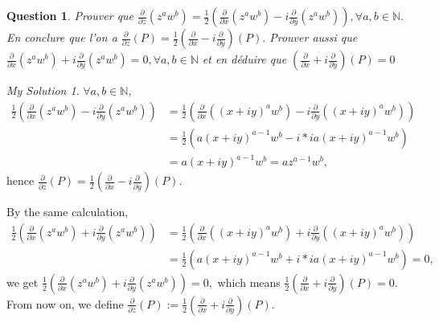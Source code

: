 \documentclass[]{article}
\newtheorem{prop}{Question}
\theoremstyle{remark}
\newtheorem*{sol}{My Solution}
\begin{document}
\begin{prop}
	Prouver que $\frac{\partial}{\partial z}\left(z^{a} w^{b}\right)=\frac{1}{2}\left(\frac{\partial}{\partial x}\left(z^{a} w^{b}\right)-i \frac{\partial}{\partial y}\left(z^{a} w^{b}\right)\right), \forall a, b \in \mathbb{N} .$ En conclure que l'on a $\frac{\partial}{\partial z}(P)=\frac{1}{2}\left(\frac{\partial}{\partial x}-i \frac{\partial}{\partial y}\right)(P) .$ Prouver aussi que $\frac{\partial}{\partial x}\left(z^{a} w^{b}\right)+i \frac{\partial}{\partial y}\left(z^{a} w^{b}\right)=0, \forall a, b \in \mathbb{N}$ et en déduire que $\left(\frac{\partial}{\partial x}+i \frac{\partial}{\partial y}\right)(P)=0$
\end{prop}
\begin{sol}
	$ \forall a, b \in \mathbb{N} $,
\[ \begin{aligned}
		\frac{1}{2}\left( \frac{\partial}{\partial x}\left(z^{a} w^{b}\right)-i\frac{\partial}{\partial y}\left(z^{a} w^{b}\right)\right) 
		&= \frac{1}{2}\left( \frac{\partial}{\partial x}\left((x+i y)^{a} w^{b}\right)-i\frac{\partial}{\partial y}\left((x+i y)^{a} w^{b}\right)\right)  \\
		&= \frac{1}{2}\left(  a(x+i y)^{a-1} w^{b}-i* i a(x+i y)^{a-1} w^{b}\right) \\
		&=a(x+i y)^{a-1} w^{b} = a z^{a-1} w^{b},
\end{aligned} \]
	hence $ \frac{\partial}{\partial z}(P) = \frac{1}{2}\left( \frac{\partial}{\partial x}-i\frac{\partial}{\partial y}\right)(P) .$
	
	By the same calculation,
\[ \begin{aligned}
	\frac{1}{2}\left( \frac{\partial}{\partial x}\left(z^{a} w^{b}\right)+i\frac{\partial}{\partial y}\left(z^{a} w^{b}\right)\right) 
	&= \frac{1}{2}\left( \frac{\partial}{\partial x}\left((x+i y)^{a} w^{b}\right)+i\frac{\partial}{\partial y}\left((x+i y)^{a} w^{b}\right)\right)  \\
	&= \frac{1}{2}\left(  a(x+i y)^{a-1} w^{b}+i* i a(x+i y)^{a-1} w^{b}\right) =0,
\end{aligned} \]
	we get $ \frac{1}{2}\left( \frac{\partial}{\partial x}\left(z^{a} w^{b}\right)+i\frac{\partial}{\partial y}\left(z^{a} w^{b}\right)\right) =0,$ which means $ \frac{1}{2}\left( \frac{\partial}{\partial x}+i\frac{\partial}{\partial y}\right)(P)=0.$ From now on, we define $ \frac{\partial}{\partial \bar{z}}(P) := \frac{1}{2}\left( \frac{\partial}{\partial x}+i\frac{\partial}{\partial y}\right)(P) .$ 
\end{sol}
\end{document}
